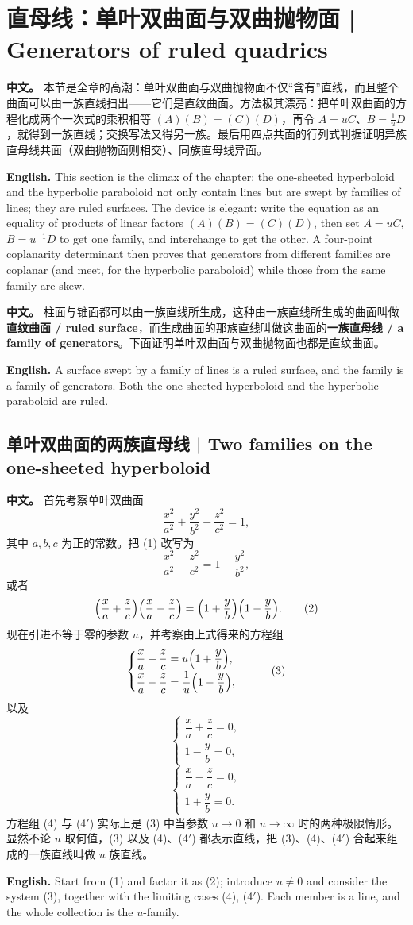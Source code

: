 \documentclass[UTF8,11pt,a4paper]{ctexart}
\newcommand{\APS}[2]{\par\noindent\textbf{中文。} #1\par\noindent\textbf{English.} #2\par\smallskip}
\theoremstyle{definition}
\begin{document}
\section{\label{sec:7}直母线：单叶双曲面与双曲抛物面 | Generators of ruled quadrics}
\APS{本节是全章的高潮：单叶双曲面与双曲抛物面不仅``含有''直线，而且整个曲面可以由一族直线扫出——它们是直纹曲面。方法极其漂亮：把单叶双曲面的方程化成两个一次式的乘积相等 $(A)(B)=(C)(D)$，再令 $A = uC$、$B = \frac1u D$，就得到一族直线；交换写法又得另一族。最后用四点共面的行列式判据证明异族直母线共面（双曲抛物面则相交）、同族直母线异面。}{This section is the climax of the chapter: the one-sheeted hyperboloid and the hyperbolic paraboloid not only contain lines but are swept by families of lines; they are ruled surfaces. The device is elegant: write the equation as an equality of products of linear factors $(A)(B)=(C)(D)$, then set $A=uC$, $B=u^{-1}D$ to get one family, and interchange to get the other. A four-point coplanarity determinant then proves that generators from different families are coplanar (and meet, for the hyperbolic paraboloid) while those from the same family are skew.}

\APS{柱面与锥面都可以由一族直线所生成，这种由一族直线所生成的曲面叫做\textbf{直纹曲面 / ruled surface}，而生成曲面的那族直线叫做这曲面的\textbf{一族直母线 / a family of generators}。下面证明单叶双曲面与双曲抛物面也都是直纹曲面。}{A surface swept by a family of lines is a ruled surface, and the family is a family of generators. Both the one-sheeted hyperboloid and the hyperbolic paraboloid are ruled.}

\subsection{单叶双曲面的两族直母线 | Two families on the one-sheeted hyperboloid}
\APS{首先考察单叶双曲面
\[
\frac{x^2}{a^2}+\frac{y^2}{b^2}-\frac{z^2}{c^2}=1,\tag{1}
\]
其中 $a,b,c$ 为正的常数。把 (1) 改写为
\[
\frac{x^2}{a^2}-\frac{z^2}{c^2}=1-\frac{y^2}{b^2},
\]
或者
\[
\Bigl(\frac{x}{a}+\frac{z}{c}\Bigr)\Bigl(\frac{x}{a}-\frac{z}{c}\Bigr)=\Bigl(1+\frac{y}{b}\Bigr)\Bigl(1-\frac{y}{b}\Bigr).\tag{2}
\]
现在引进不等于零的参数 $u$，并考察由上式得来的方程组
\[
\begin{cases}\dfrac{x}{a}+\dfrac{z}{c}=u\Bigl(1+\dfrac{y}{b}\Bigr),\\[4pt] \dfrac{x}{a}-\dfrac{z}{c}=\dfrac1u\Bigl(1-\dfrac{y}{b}\Bigr),\end{cases}\tag{3}
\]
以及
\[
\begin{cases}\dfrac{x}{a}+\dfrac{z}{c}=0,\\ 1-\dfrac{y}{b}=0,\end{cases}\tag{4}
\]
\[
\begin{cases}\dfrac{x}{a}-\dfrac{z}{c}=0,\\ 1+\dfrac{y}{b}=0.\end{cases}\tag{4$'$}
\]
方程组 (4) 与 (4$'$) 实际上是 (3) 中当参数 $u\to 0$ 和 $u\to\infty$ 时的两种极限情形。显然不论 $u$ 取何值，(3) 以及 (4)、(4$'$) 都表示直线，把 (3)、(4)、(4$'$) 合起来组成的一族直线叫做 $u$ 族直线。}{Start from (1) and factor it as (2); introduce $u\ne0$ and consider the system (3), together with the limiting cases (4), (4$'$). Each member is a line, and the whole collection is the $u$-family.}
\end{document}
